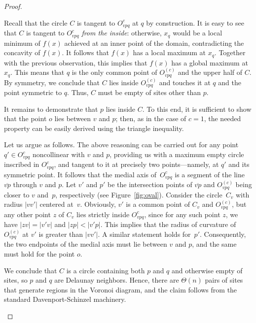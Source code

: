 \documentclass[10pt, conference, compsocconf]{IEEEtran}
\begin{document}
\begin{proof}
\begin{itemize}
      Recall that the circle $C$ is tangent to $O_{vpq}^{c}$ at $q$ by
      construction.
      It is easy to see that $C$ is tangent to $O_{vpq}^{c}$ \emph{from
      the inside}: otherwise, $x_q$ would be a local minimum of $f(x)$
      achieved at an inner point of the domain, contradicting the concavity
      of $f(x)$.  It follows that $f(x)$ has a local maximum at $x_q$.
      Together with the previous observation, this implies that $f(x)$ has
      a global maximum at $x_q$. This means that $q$ is the only common
      point of $O_{vpq}^{(c)}$ and the upper half of $C$.  By symmetry, we
      conclude that $C$ lies inside $O_{vpq}^{(c)}$ and touches it at $q$
      and the point symmetric to $q$.  Thus, $C$ must be empty of sites
      other than $p$.

      It remains to demonstrate that $p$ lies inside $C$.  To this end, it
      is sufficient to show that the point $o$ lies between $v$ and $p$;
      then, as in the case of $c=1$, the needed property can be easily
      derived using the triangle inequality.

      Let us argue as follows.  The above reasoning can be carried out for
      any point $q'\in O_{vpq}^{c}$ noncollinear with $v$ and $p$, providing
      us with a maximum empty circle inscribed in $O_{vpq}^{c}$, and tangent
      to it at precisely two points---namely, at $q'$ and its symmetric
      point.  It follows that the medial axis of~$O_{vpq}^{c}$ is a segment
      of the line $\overline{vp}$ through $v$ and $p$.
      Let $v'$ and $p'$ be the intersection points of $\overline{vp}$ and
      $O_{vpq}^{(c)}$ being closer to $v$ and~$p$, respectively (see
      Figure~\ref{fig:oval}).  Consider the circle~$C_v$ with radius $|vv'|$
      centered at~$v$.  Obviously, $v'$ is a common point of $C_v$ and
      $O_{vpq}^{(c)}$, but any other point $z$ of $C_v$ lies strictly inside
      $O_{vpq}^{c}$, since for any such point $z$, we have $|zv|=|v'v|$ and
       $|zp|<|v'p|$.
      This implies that the radius of curvature of $O_{vpq}^{(c)}$ at $v'$
      is greater than $|vv'|$.  A similar statement holds for~$p'$.
      Consequently, the two endpoints of the medial axis must lie between
      $v$ and $p$, and the same must hold for the point $o$.

      We conclude that $C$ is a circle containing both $p$ and $q$ and
      otherwise empty of sites, so $p$ and $q$ are Delaunay neighbors.
      Hence, there are $\Theta(n)$ pairs of sites that generate regions in
      the Voronoi diagram, and the claim follows from the standard
      Davenport-Schinzel machinery.
   \end{itemize}
\end{proof}
\end{document}
